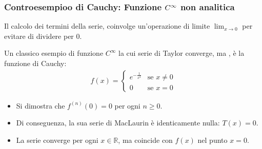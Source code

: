 \documentclass[letterpaper,10pt,italian]{jupyterBook}
\begin{document}
\subsubsection*{Controesempioo di Cauchy: Funzione \protect\(C^\infty\protect\) non analitica}

\sphinxAtStartPar
{} Il calcolo dei termini della serie, coinvolge un’operazione di limite \(\lim_{x \rightarrow 0}\) per evitare di dividere per \(0\).

\sphinxAtStartPar
Un classico esempio di funzione \(C^\infty\) la cui serie di Taylor converge, ma , è la funzione di Cauchy:
\begin{equation*}
\begin{split}f(x) = \begin{cases} 
e^{-\frac{1}{x^2}} & \text{se } x \neq 0 \\ 
0 & \text{se } x = 0 
\end{cases}\end{split}
\end{equation*}\begin{itemize}
\item {} 
\sphinxAtStartPar
Si dimostra che \(f^{(n)}(0) = 0\) per ogni \(n \ge 0\).

\item {} 
\sphinxAtStartPar
Di conseguenza, la sua serie di MacLaurin è identicamente nulla: \(T(x) = 0\).

\item {} 
\sphinxAtStartPar
La serie converge per ogni \(x \in \mathbb{R}\), ma coincide con \(f(x)\)  nel punto \(x = 0\).

\end{itemize}



\sphinxstepscope
\end{document}

